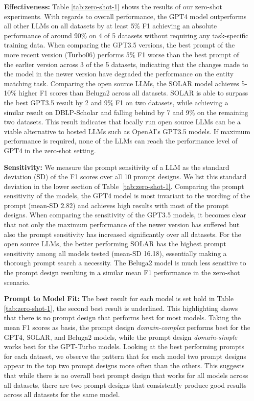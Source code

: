 \documentclass[sigconf,nonacm]{acmart}
\begin{document}
\textbf{Effectiveness:} Table \ref{tab:zero-shot-1} shows the results of our zero-shot experiments. With regards to overall performance, the GPT4 model outperforms all other LLMs on all datasets by at least 5\% F1 achieving an absolute performance of around 90\% on 4 of 5 datasets without requiring any task-specific training data.  When comparing the GPT3.5 versions, the best prompt of the more recent version (Turbo06) performs 5\% F1 worse than the best prompt of the earlier version across 3 of the 5 datasets, indicating that the changes made to the model in the newer version have degraded the performance on the entity matching task. Comparing the open source LLMs, the SOLAR model achieves 5-10\% higher F1 scores than Beluga2 across all datasets. SOLAR is able to surpass the best GPT3.5 result by 2 and 9\% F1 on two datasets, while achieving a similar result on DBLP-Scholar and falling behind by 7 and 9\% on the remaining two datasets. This result indicates that locally run open source LLMs can be a viable alternative to hosted LLMs such as OpenAI's GPT3.5 models. If maximum performance is required, none of the LLMs can reach the performance level of GPT4 in the zero-shot setting.

\textbf{Sensitivity:} We measure the prompt sensitivity of a LLM as the standard deviation (SD) of the F1 scores over all 10 prompt designs. We list this standard deviation in the lower section of Table~\ref{tab:zero-shot-1}. Comparing the prompt sensitivity of the models, the GPT4 model is most invariant to the wording of the prompt (mean-SD 2.82) and achieves high results with most of the prompt designs. When comparing the sensitivity of the GPT3.5 models, it becomes clear that not only the maximum performance of the newer version has suffered but also the prompt sensitivity has increased significantly over all datasets. For the open source LLMs, the better performing SOLAR has the highest prompt sensitivity among all models tested (mean-SD 16.18), essentially making a thorough prompt search a necessity. The Beluga2 model is much less sensitive to the prompt design resulting in a similar mean F1 performance in the zero-shot scenario. 

\textbf{Prompt to Model Fit:} The best result for each model is set bold in Table \ref{tab:zero-shot-1}, the second best result is underlined. This highlighting shows that there is no prompt design that performs best for most models. Taking the mean F1 scores as basis, the prompt design \textit{domain-complex} performs best for the GPT4, SOLAR, and Beluga2 models, while the prompt design \textit{domain-simple} works best for the GPT-Turbo models. Looking at the best performing prompts for each dataset, we observe the pattern that for each model two prompt designs appear in the top two prompt designs more often than the others. This suggests that while there is no overall best prompt design that works for all models across all datasets, there are two prompt designs that consistently produce good results across all datasets for the same model. 
\end{document}
